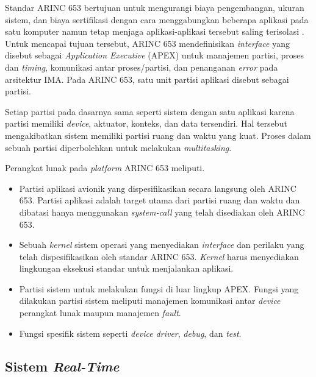 Standar ARINC 653 bertujuan untuk mengurangi biaya pengembangan, ukuran sistem, dan biaya
sertifikasi dengan cara menggabungkan beberapa aplikasi pada satu komputer namun tetap menjaga
aplikasi-aplikasi tersebut saling terisolasi
\citep[pp.~3-30]{AirlinesElectronicEngineeringCommittee2012}.  Untuk mencapai tujuan tersebut,
ARINC 653 mendefinisikan \textit{interface} yang disebut sebagai \textit{Application Executive}
(APEX) untuk manajemen partisi, proses dan \textit{timing}, komunikasi antar proses/partisi, dan
penanganan \textit{error} pada arsitektur IMA.  Pada ARINC 653, satu unit partisi aplikasi
disebut sebagai partisi.

Setiap partisi pada dasarnya sama seperti sistem dengan satu aplikasi karena partisi memiliki
\textit{device}, aktuator, konteks, dan data tersendiri.  Hal tersebut mengakibatkan sistem
memiliki partisi ruang dan waktu yang kuat.  Proses dalam sebuah partisi diperbolehkan untuk
melakukan \textit{multitasking}.

Perangkat lunak pada \textit{platform} ARINC 653 meliputi.

\begin{itemize}

    \item Partisi aplikasi avionik yang dispesifikasikan secara langsung oleh ARINC 653. Partisi
    	    aplikasi adalah target utama dari partisi ruang dan waktu dan dibatasi hanya
    	    menggunakan \textit{system-call} yang telah disediakan oleh ARINC 653.

    \item Sebuah \textit{kernel} sistem operasi yang menyediakan \textit{interface} dan perilaku
    	    yang telah dispesifikasikan oleh standar ARINC 653. \textit{Kernel} harus
    	    menyediakan lingkungan eksekusi standar untuk menjalankan aplikasi.

    \item Partisi sistem untuk melakukan fungsi di luar lingkup APEX. Fungsi yang dilakukan
    	    partisi sistem meliputi manajemen komunikasi antar \textit{device} perangkat lunak
    	    maupun manajemen \textit{fault}.

    \item Fungsi spesifik sistem seperti \textit{device driver}, \textit{debug}, dan
    	    \textit{test}.

\end{itemize}

\subsection{Sistem \textit{Real-Time}}

